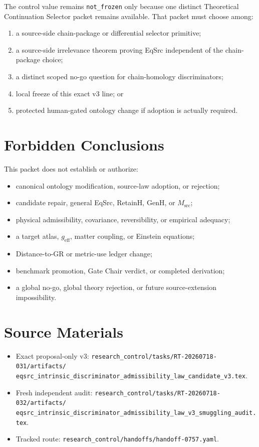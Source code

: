 \documentclass[11pt]{article}
\begin{document}
The control value remains \texttt{not\_frozen} only because one distinct
Theoretical Continuation Selector packet remains available. That packet must
choose among:
\begin{enumerate}[leftmargin=*]
  \item a source-side chain-package or differential selector primitive;
  \item a source-side irrelevance theorem proving EqSrc independent of the
  chain-package choice;
  \item a distinct scoped no-go question for chain-homology discriminators;
  \item local freeze of this exact v3 line; or
  \item protected human-gated ontology change if adoption is actually
  required.
\end{enumerate}

\section{Forbidden Conclusions}

This packet does not establish or authorize:
\begin{itemize}[leftmargin=*]
  \item canonical ontology modification, source-law adoption, or rejection;
  \item candidate repair, general EqSrc, RetainH, GenH, or \(M_{\mathrm{src}}\);
  \item physical admissibility, covariance, reversibility, or empirical
  adequacy;
  \item a target atlas, \(g_{\mathrm{eff}}\), matter coupling, or Einstein
  equations;
  \item Distance-to-GR or metric-use ledger change;
  \item benchmark promotion, Gate Chair verdict, or completed derivation;
  \item a global no-go, global theory rejection, or future source-extension
  impossibility.
\end{itemize}

\section{Source Materials}

\begin{itemize}[leftmargin=*]
  \item Exact proposal-only v3:
  \texttt{research\_control/tasks/RT-20260718-031/artifacts/}
  \texttt{eqsrc\_intrinsic\_discriminator\_admissibility\_law\_candidate\_v3.tex}.
  \item Fresh independent audit:
  \texttt{research\_control/tasks/RT-20260718-032/artifacts/}
  \texttt{eqsrc\_intrinsic\_discriminator\_admissibility\_law\_v3\_smuggling\_audit.tex}.
  \item Tracked route:
  \texttt{research\_control/handoffs/handoff-0757.yaml}.
\end{itemize}
\end{document}
